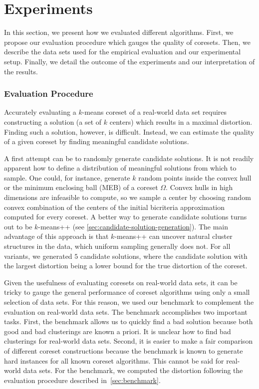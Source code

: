 


\section{Experiments} \label{sec:experiments}
In this section, we present how we evaluated different algorithms. First, we propose our evaluation procedure which gauges the quality of coresets. Then, we describe the data sets used for the empirical evaluation and our experimental setup. Finally, we detail the outcome of the experiments and our interpretation of the results.

\subsubsection*{Evaluation Procedure}
\label{sec:evaluation-procedure}
Accurately evaluating a $k$-means coreset of a real-world data set requires constructing a solution (a set of $k$ centers) which results in a maximal distortion. Finding such a solution, however, is difficult. Instead, we can estimate the quality of a given coreset by finding meaningful candidate solutions. 

A first attempt can be to randomly generate candidate solutions. It is not readily apparent how to define a distribution of meaningful solutions from which to sample. One could, for instance, generate $k$ random points inside the convex hull or the minimum enclosing ball (MEB) of a coreset $\Omega$. Convex hulls in high dimensions are infeasible to compute, so we sample a center by choosing random convex combination of the centers of the initial bicriteria approximation computed for every coreset. 
A better way to generate candidate solutions turns out to be $k$-means++ (see \cref{sec:candidate-solution-generation}). The main advantage of this approach is that $k$-means++ can uncover natural cluster structures in the data, which uniform sampling generally does not.
For all variants, we generated $5$ candidate solutions, where the candidate solution with the largest distortion being a lower bound for the true distortion of the coreset.

Given the usefulness of evaluating coresets on real-world data sets, it can be tricky to gauge the general performance of coreset algorithms using only a small selection of data sets. For this reason, we used our benchmark to complement the evaluation on real-world data sets. The benchmark accomplishes two important tasks. First, the benchmark allows us to quickly find a bad solution because both good and bad clusterings are known a priori. It is unclear how to find bad clusterings for real-world data sets. Second, it is easier to make a fair comparison of different coreset constructions because the benchmark is known to generate hard instances for all known coreset algorithms. This cannot be said for real-world data sets. For the benchmark, we computed the distortion following the evaluation procedure described in~\cref{sec:benchmark}. 

